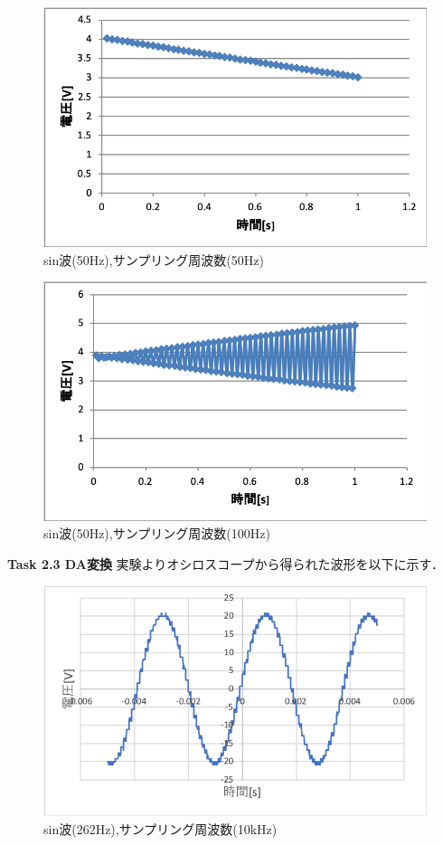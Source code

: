 \documentclass[11pt, a4paper,twocolumn]{jarticle}
\begin{document}
\begin{figure}[htbp]
 \begin{center}
  \includegraphics[width=0.8\linewidth]{fig11.png}
 \end{center}
 \caption{sin波(50Hz),サンプリング周波数(50Hz)}
 \label{fig:11}
\end{figure}

\begin{figure}[htbp]
 \begin{center}
  \includegraphics[width=0.8\linewidth]{fig12.png}
 \end{center}
 \caption{sin波(50Hz),サンプリング周波数(100Hz)}
 \label{fig:12}
\end{figure}

\newpage

\noindent
\textbf{Task 2.3 DA変換}
実験よりオシロスコープから得られた波形を以下に示す．
\begin{figure}[htbp]
 \begin{center}
  \includegraphics[width=0.8\linewidth]{fig13.png}
 \end{center}
 \caption{sin波(262Hz),サンプリング周波数(10kHz)}
 \label{fig:13}
\end{figure}
\end{document}
